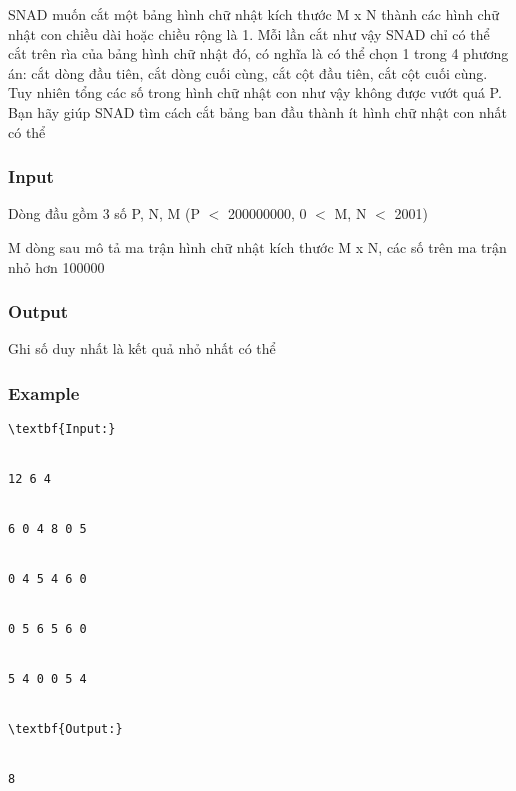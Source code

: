



   SNAD muốn cắt một bảng hình chữ nhật kích thước M x N thành các hình chữ nhật con chiều dài hoặc chiều rộng là 1. Mỗi lần cắt như vậy SNAD chỉ có thể cắt trên rìa của bảng hình chữ nhật đó, có nghĩa là có thể chọn 1 trong 4 phương án: cắt dòng đầu tiên, cắt dòng cuối cùng, cắt cột đầu tiên, cắt cột cuối cùng. Tuy nhiên tổng các số trong hình chữ nhật con như vậy không được vướt quá P. Bạn hãy giúp SNAD tìm cách cắt bảng ban đầu thành ít hình chữ nhật con nhất có thể  

\subsubsection{   Input  }




   Dòng đầu gồm 3 số P, N, M (P $<$ 200000000, 0 $<$ M, N $<$ 2001)   


   M dòng sau mô tả ma trận hình chữ nhật kích thước M x N, các số trên ma trận nhỏ hơn 100000  

\subsubsection{   Output  }




   Ghi số duy nhất là kết quả nhỏ nhất có thể  

\subsubsection{   Example  }
\begin{verbatim}
\textbf{Input:}


12 6 4


6 0 4 8 0 5


0 4 5 4 6 0


0 5 6 5 6 0


5 4 0 0 5 4


\textbf{Output:}


8


\end{verbatim}
